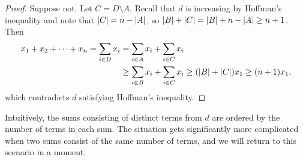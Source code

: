 \begin{proof}
Suppose not.
Let $C = D \setminus A$. Recall that $d$ is increasing by Hoffman's inequality and note that $\lvert C\rvert = n - \lvert A\rvert$, so $\lvert B\rvert + \lvert C\rvert = \lvert B\rvert + n - \lvert A\rvert \geq n + 1$. Then
\begin{align*}
 x_1 + x_2 + \dotsb + x_n
= \sum_{i \in D} x_i
&= \sum_{i \in A} x_i + \sum_{i \in C} x_i \\
&\geq \sum_{i \in B} x_i + \sum_{i \in C} x_i
\geq (\lvert B\rvert + \lvert C\rvert) x_1
\geq (n + 1) x_1,
\end{align*}
which contradicts $d$ satisfying Hoffman's inequality.
\end{proof}

\noindent Intuitively, the sums consisting of distinct terms from $d$ are ordered by the number of terms in each sum. The situation gets significantly more complicated when two sums consist of the same number of terms, and we will return to this scenario in a moment.

